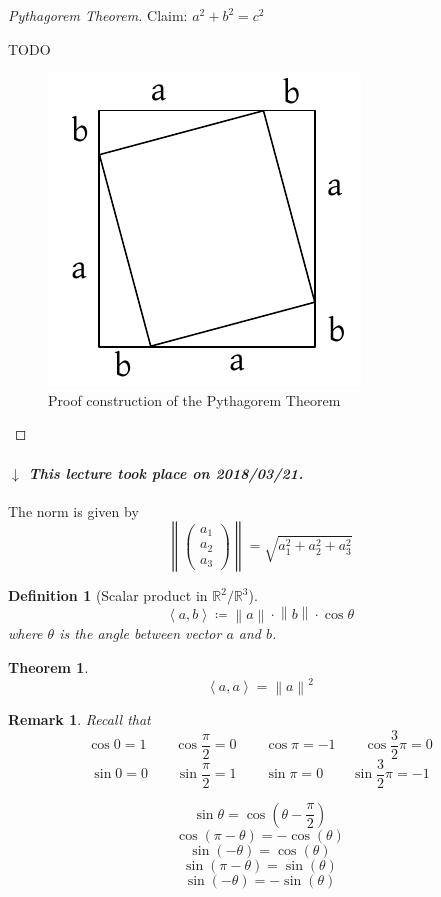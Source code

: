 \documentclass{article}
\newtheorem{theorem}{Theorem}  \numberwithin{theorem}{section}
\newtheorem{definition}{Definition}  \numberwithin{definition}{section}
\newtheorem{remark}{Remark}  \numberwithin{remark}{section}
\newcommand{\angel}[1]{\left\langle#1\right\rangle}
\newcommand{\norm}[1]{\left\|#1\right\|}
\newcommand{\dateref}[1]{%
  \begin{mdframed}[backgroundcolor=gray!10,innerbottommargin=0pt,innertopmargin=0pt]
    \paragraph{\textit{$\downarrow$ This lecture took place on #1.}}%
  \end{mdframed}%
}
\begin{document}
\begin{proof}[Pythagorem Theorem]
  Claim: $a^2 + b^2 = c^2$

  TODO

  \begin{figure}[!h]
    \begin{center}
      \includegraphics{img/03_pytha.pdf}
      \caption{Proof construction of the Pythagorem Theorem}
      \label{fig:pytha}
    \end{center}
  \end{figure}
\end{proof}

\dateref{2018/03/21}

The norm is given by
\[ \norm{\begin{pmatrix} a_1 \\ a_2 \\ a_3 \end{pmatrix}} = \sqrt{a_1^2 + a_2^2 + a_3^2} \]

\begin{definition}[Scalar product in $\mathbb R^2/\mathbb R^3$]
  \[ \angel{a, b} \coloneqq \norm{a} \cdot \norm{b} \cdot \cos{\theta} \]
  where $\theta$ is the angle between vector $a$ and $b$.
\end{definition}

\begin{theorem}
  \[ \angel{a,a} = \norm{a}^2 \]
\end{theorem}

\begin{remark}
  Recall that
  \[ \cos{0} = 1 \qquad \cos{\frac\pi2} = 0 \qquad \cos{\pi} = -1 \qquad \cos{\frac32 \pi} = 0 \]
  \[ \sin{0} = 0 \qquad \sin{\frac\pi2} = 1 \qquad \sin{\pi} = 0 \qquad \sin{\frac32 \pi} = -1 \]

  \[ \sin\theta = \cos(\theta - \frac\pi2) \]
  \[ \cos(\pi - \theta) = -\cos(\theta) \]
  \[ \sin(-\theta) = \cos(\theta) \]
  \[ \sin(\pi - \theta) = \sin(\theta) \]
  \[ \sin(-\theta) = -\sin(\theta) \]
\end{remark}
\end{document}
